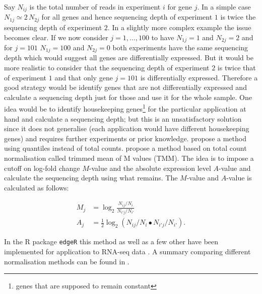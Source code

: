 Say $N_{ij}$ is the total number of reads in experiment $i$ for gene $j$. In a simple case $N_{1j} \simeq 2 \, N_{2j}$ for all genes and hence sequencing depth of experiment $1$ is twice the sequencing depth of experiment $2$. In a slightly more complex example the issue becomes clear. If we now consider $j = 1, \ldots,  100$ to have $N_{1j} = 1$ and $N_{2j} = 2$ and for $j = 101$ $N_{1j} = 100$ and $N_{2j} = 0$ both experiments have the same sequencing depth which would suggest all genes are differentially expressed. But it would be more realistic to consider that the sequencing depth of experiment $2$ is twice that of experiment $1$ and that only gene $j = 101$ is differentially expressed. Therefore a good strategy would be identify genes that are not differentially expressed and calculate a sequencing depth just for those and use it for the whole sample. One idea would be to identify housekeeping genes\footnote{genes that are supposed to remain constant} for the particular application at hand and calculate a sequencing depth; but this is an unsatisfactory solution since it does not generalise (each application would have different housekeeping genes) and requires further experiments or prior knowledge. \cite{Bullard:2010go} propose a method using quantiles instead of total counts. \cite{Robinson:2010dd} propose a method based on total count normalisation called trimmed mean of M values (TMM). The idea is to impose a cutoff on log-fold change $M$-value and the absolute expression level $A$-value and calculate the sequencing depth using what remains. The $M$-value  and $A$-value is calculated as follows:

\begin{eqnarray}
  \label{eq:MA-values}
  M_j &= \log_2 \frac{N_{ij} / N_i}{N_{i'j}/ N_{i'}} \\
  A_j &= \frac{1}{2} \log_2 \left(N_{ij}/ N_i \bullet N_{i'j} / N_{i'} \right).
\end{eqnarray}

In the R package \texttt{edgeR} this method as well as a few other have been implemented for application to RNA-seq data \cite{Robinson:2010cw}. 
A summary comparing different normalisation methods can be found in \cite{Oshlack:2010kr}. 


